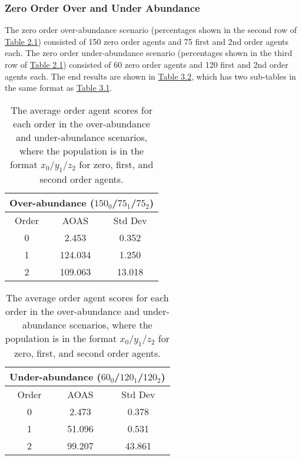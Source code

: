 \subsubsection{Zero Order Over and Under Abundance}

The zero order over-abundance scenario (percentages shown in the second row of \hyperref[tab:reg-population-table]{Table 2.1}) consisted of 150 zero order agents and 75 first and 2nd order agents each. The zero order under-abundance scenario (percentages shown in the third row of \hyperref[tab:reg-population-table]{Table 2.1}) consisted of 60 zero order agents and 120 first and 2nd order agents each. The end results are shown in \hyperref[table:non-sig-zero-order-simple]{Table 3.2}, which has two sub-tables in the same format as \hyperref[table:non-sig-default-equal-simple]{Table 3.1}.

\begin{table}[h]
\centering
\begin{tabular}{|c|c|c|}
\hline
\multicolumn{3}{|c|}{Over-abundance ($150_{0}$/$75_{1}$/$75_{2}$)} \\
\hline
Order & AOAS & Std Dev \\
\hline
0     & 2.453   & 0.352   \\
1     & 124.034 & 1.250   \\
2     & 109.063 & 13.018  \\
\hline
\end{tabular}
\qquad
\begin{tabular}{|c|c|c|}
\hline
\multicolumn{3}{|c|}{Under-abundance ($60_{0}$/$120_{1}$/$120_{2}$)} \\
\hline
Order & AOAS & Std Dev \\
\hline
0     & 2.473   & 0.378   \\
1     & 51.096  & 0.531   \\
2     & 99.207  & 43.861  \\
\hline
\end{tabular}
\caption{The average order agent scores for each order in the over-abundance and under-abundance scenarios, where the population is in the format $x_{0}$/$y_{1}$/$z_{2}$ for zero, first, and second order agents.}
\label{table:non-sig-zero-order-simple}
\end{table}

